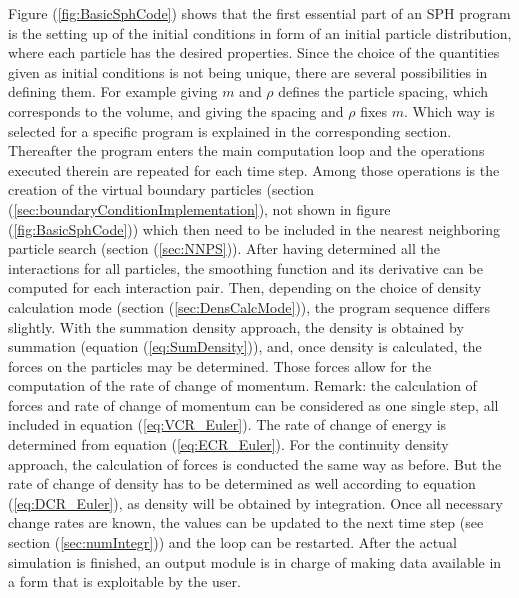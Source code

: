 \documentclass{report}
\begin{document}
Figure (\ref{fig:BasicSphCode}) shows that the first essential part of an SPH program is the setting up of the initial conditions in form of an initial particle distribution, where each particle has the desired properties.
Since the choice of the quantities given as 
initial conditions is not being unique, there are several possibilities in defining 
them. For example giving $m$ and $\rho$ defines the particle spacing, which corresponds to the volume, and giving the spacing and $\rho$ fixes $m$. Which way is selected for a specific program is explained in the corresponding section. 
Thereafter the program enters the main computation loop and the operations executed 
therein are repeated for each time step. Among those operations is the creation of the 
virtual boundary particles (section (\ref{sec:boundaryConditionImplementation}), not shown in figure (\ref{fig:BasicSphCode})) which then 
need to be included in the nearest neighboring particle search (section (\ref{sec:NNPS})). 
After having determined all the interactions for all particles, the smoothing function 
and its derivative can be computed for each interaction pair. Then, depending on the 
choice of density calculation mode (section (\ref{sec:DensCalcMode})), the program sequence differs slightly. 
With the summation density approach, the density is obtained by summation 
(equation (\ref{eq:SumDensity})), and, once density is calculated, the forces on the 
particles may be determined. Those forces allow for the computation of the rate
of change of momentum. Remark: the calculation of forces and rate of change of  momentum 
can be considered as one single step, all included in equation (\ref{eq:VCR_Euler}). The rate of change of energy is determined from equation (\ref{eq:ECR_Euler}).
For the continuity density approach, the calculation of forces is conducted the same way as before. But the rate of change of density 
has to be determined as well according to equation (\ref{eq:DCR_Euler}), as density will be obtained by integration. 
Once all necessary change rates are known, the values can be updated to the next time step (see section (\ref{sec:numIntegr})) and the loop can be restarted. After the actual simulation is finished, an output module is in charge of making data available in a form that is exploitable by the user.
\end{document}
